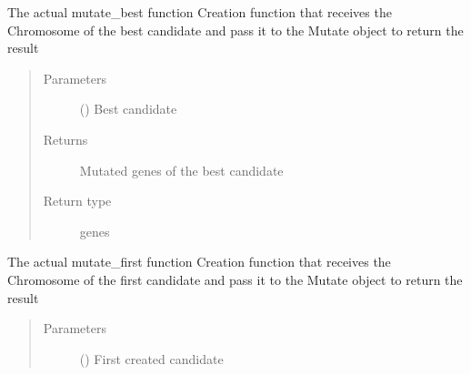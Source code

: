 \documentclass[letterpaper,10pt,english]{sphinxmanual}
\begin{document}
\begin{fulllineitems}
\begin{fulllineitems}
\label{\detokenize{genetic:genetic.Genetic.mutate_best}}
\sphinxAtStartPar
The actual mutate\_best function
Creation function that receives the Chromosome of the best candidate and pass it to the Mutate object to return
the result
\begin{quote}\begin{description}
\item[{Parameters}] \leavevmode
\sphinxAtStartPar
{} ({\hyperref[\detokenize{genetic:genetic.Chromosome}]{}}) \textendash{} Best candidate

\item[{Returns}] \leavevmode
\sphinxAtStartPar
Mutated genes of the best candidate

\item[{Return type}] \leavevmode
\sphinxAtStartPar
genes

\end{description}\end{quote}

\end{fulllineitems}


\begin{fulllineitems}
\label{\detokenize{genetic:genetic.Genetic.mutate_first}}
\sphinxAtStartPar
The actual mutate\_first function
Creation function that receives the Chromosome of the first candidate and pass it to the Mutate object to return
the result
\begin{quote}\begin{description}
\item[{Parameters}] \leavevmode
\sphinxAtStartPar
{} ({\hyperref[\detokenize{genetic:genetic.Chromosome}]{}}) \textendash{} First created candidate


\end{description}
\end{quote}
\end{fulllineitems}
\end{fulllineitems}
\end{document}
